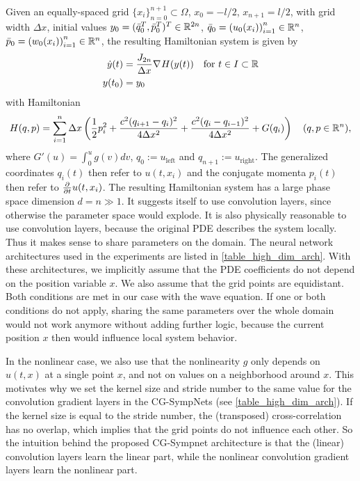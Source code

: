 \documentclass[twoside,a4paper]{article}
\begin{document}
Given an equally-spaced grid $\{ x_i \}_{n=0}^{n+1} \subset \Omega$, $x_0 = -l/2$, $x_{n+1} = l/2$,
with grid width $\Delta x$,
initial values $y_0 = (\bar{q}_0^T, \bar{p}_0^T)^T \in \mathbb{R}^{2n}$, $\bar{q}_0 = \left( u_0(x_i) \right)_{i=1}^n \in \mathbb{R}^n$, 
$\bar{p}_0 = \left( w_0(x_i) \right)_{i=1}^n \in \mathbb{R}^n$,
the resulting Hamiltonian system is given by
\begin{align*}
	\dot{y}(t) &= \frac{J_{2n}}{\Delta x} \nabla_{}{H}(y(t)) \quad \text{for } t \in I \subset \mathbb{R} \\
	y(t_0) &= y_0
\end{align*}
with Hamiltonian
\begin{equation*}
	H(q,p) = \sum_{i=1}^n \Delta x \left( 
	\frac{1}{2} p_i^2 + \frac{c^2 (q_{i+1} - q_i)^2}{4 \Delta x^2} 
	+ \frac{c^2 (q_i - q_{i-1})^2}{4 \Delta x^2} + G(q_i)
	\right)
	\quad (q,p \in \mathbb{R}^n)
	,
\end{equation*}
where $G'(u) = \int_0^u g(v) dv$, $q_0 := u_{\text{left}}$ and $q_{n+1} := u_{\text{right}}$.
The generalized coordinates $q_i(t)$ then refer to $u(t,x_i)$ and 
the conjugate momenta $p_i(t)$ then refer to $\frac{\partial }{\partial t} u(t,x_i)$.
The resulting Hamiltonian system has a large phase space dimension $d=n \gg 1$.
It suggests itself to use convolution layers, since otherwise
the parameter space would explode. It is also physically reasonable
to use convolution layers, because the original PDE describes the system locally.
Thus it makes sense to share parameters on the domain.
The neural network architectures used in the experiments
are listed in \cref{table_high_dim_arch}. With these architectures,
we implicitly assume that the PDE coefficients do not depend on the position variable $x$.
We also assume that the grid points are equidistant. Both conditions are met
in our case with the wave equation. If one or both conditions do not apply, sharing the same
parameters over the whole domain would not work anymore without 
adding further logic, because the current position $x$ then would influence
local system behavior.

In the nonlinear case, we also use that the nonlinearity $g$ 
only depends on $u(t,x)$ at a single point $x$, and not
on values on a neighborhood around $x$. 
This motivates why we set the kernel size and stride number
to the same value for the convolution gradient layers in 
the CG-SympNets (see \cref{table_high_dim_arch}).
If the kernel size is equal to the stride number, the (transposed) cross-correlation
has no overlap, which implies that the grid points do not influence each other.
So the intuition behind the 
proposed CG-Sympnet architecture is that the (linear) convolution layers learn the
linear part, while the nonlinear convolution gradient layers learn the nonlinear part.
\end{document}
